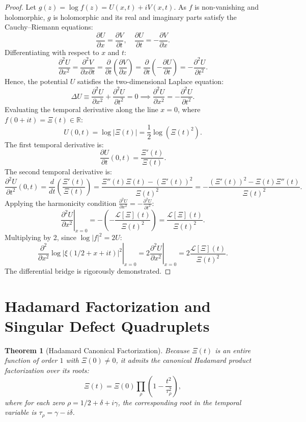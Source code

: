 \documentclass[11pt,a4paper]{article}
\newtheorem{theorem}{Theorem}[section]
\theoremstyle{definition}
\theoremstyle{remark}
\begin{document}
\begin{proof}
Let $g(z) = \log f(z) = U(x, t) + i V(x, t)$. As $f$ is non-vanishing and holomorphic, $g$ is holomorphic and its real and imaginary parts satisfy the Cauchy--Riemann equations:
\[
\frac{\partial U}{\partial x} = \frac{\partial V}{\partial t}, \quad \frac{\partial U}{\partial t} = -\frac{\partial V}{\partial x}.
\]
Differentiating with respect to $x$ and $t$:
\[
\frac{\partial^2 U}{\partial x^2} = \frac{\partial^2 V}{\partial x \partial t} = \frac{\partial}{\partial t}\left(\frac{\partial V}{\partial x}\right) = \frac{\partial}{\partial t}\left(-\frac{\partial U}{\partial t}\right) = -\frac{\partial^2 U}{\partial t^2}.
\]
Hence, the potential $U$ satisfies the two-dimensional Laplace equation:
\[
\Delta U \equiv \frac{\partial^2 U}{\partial x^2} + \frac{\partial^2 U}{\partial t^2} = 0 \implies \frac{\partial^2 U}{\partial x^2} = -\frac{\partial^2 U}{\partial t^2}.
\]
Evaluating the temporal derivative along the line $x = 0$, where $f(0+it) = \Xi(t) \in \mathbb{R}$:
\[
U(0, t) = \log |\Xi(t)| = \frac{1}{2}\log (\Xi(t)^2).
\]
The first temporal derivative is:
\[
\frac{\partial U}{\partial t}(0, t) = \frac{\Xi'(t)}{\Xi(t)}.
\]
The second temporal derivative is:
\[
\frac{\partial^2 U}{\partial t^2}(0, t) = \frac{d}{dt}\left(\frac{\Xi'(t)}{\Xi(t)}\right) = \frac{\Xi''(t)\Xi(t) - (\Xi'(t))^2}{\Xi(t)^2} = -\frac{(\Xi'(t))^2 - \Xi(t)\Xi''(t)}{\Xi(t)^2}.
\]
Applying the harmonicity condition $\frac{\partial^2 U}{\partial x^2} = -\frac{\partial^2 U}{\partial t^2}$:
\[
\left.\frac{\partial^2 U}{\partial x^2}\right|_{x=0} = -\left(-\frac{\mathcal{L}[\Xi](t)}{\Xi(t)^2}\right) = \frac{\mathcal{L}[\Xi](t)}{\Xi(t)^2}.
\]
Multiplying by 2, since $\log |f|^2 = 2U$:
\[
\left.\frac{\partial^2}{\partial x^2}\log |\xi(1/2 + x + it)|^2\right|_{x=0} = 2 \left.\frac{\partial^2 U}{\partial x^2}\right|_{x=0} = 2 \frac{\mathcal{L}[\Xi](t)}{\Xi(t)^2}.
\]
The differential bridge is rigorously demonstrated.
\end{proof}

\section{Hadamard Factorization and Singular Defect Quadruplets}

\begin{theorem}[Hadamard Canonical Factorization]
Because $\Xi(t)$ is an entire function of order $1$ with $\Xi(0) \neq 0$, it admits the canonical Hadamard product factorization over its roots:
\begin{equation}
\Xi(t) = \Xi(0) \prod_{\rho} \left(1 - \frac{t^2}{\tau_\rho^2}\right),
\end{equation}
where for each zero $\rho = 1/2 + \delta + i\gamma$, the corresponding root in the temporal variable is $\tau_\rho = \gamma - i\delta$.
\end{theorem}
\end{document}
